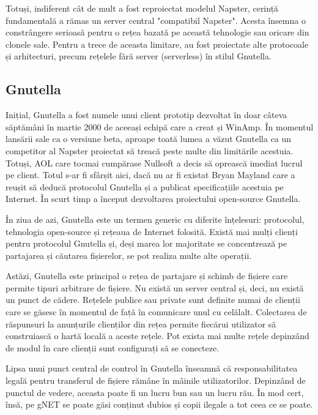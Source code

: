 Totuși, indiferent cât de mult a fost reproiectat modelul Napster, cerință
fundamentală a rămas un server central "compatibil Napster". Acesta însemna o
constrângere serioasă pentru o rețea bazată pe această tehnologie sau oricare
din clonele sale. Pentru a trece de aceasta limitare, au fost proiectate alte
protocoale și arhitecturi, precum rețelele fără server (serverless) în stilul
Gnutella.

\subsection{Gnutella}

Inițial, Gnutella a fost numele unui client prototip dezvoltat în doar câteva
săptămâni în martie 2000 de aceeași echipă care a creat și WinAmp. În momentul
lansării sale ca o versiune beta, aproape toată lumea a văzut Gnutella ca un
competitor al Napster proiectat să  treacă peste multe din limitările
acestuia. Totuși, AOL care tocmai cumpărase Nullsoft a decis să oprească
imediat lucrul pe client. Totul s-ar fi sfârșit aici, dacă nu ar fi existat
Bryan Mayland care a reușit să deducă protocolul Gnutella și a publicat
specificațiile acestuia pe Internet. În scurt timp a început dezvoltarea
proiectului open-source Gnutella.

În ziua de azi, Gnutella este un termen generic cu diferite înțelesuri:
protocolul, tehnologia open-source și rețeaua de Internet folosită. Există mai
mulți clienți pentru protocolul Gnutella și, deși marea lor majoritate se
concentrează pe partajarea și căutarea fișierelor, se pot realiza multe alte
operații.

Astăzi, Gnutella este principal o rețea de partajare și schimb de fișiere care
permite tipuri arbitrare de fișiere. Nu există un server central și, deci, nu
există un punct de cădere. Rețelele publice sau private sunt definite numai de
clienții care se găsesc în momentul de față în comunicare unul cu celălalt.
Colectarea de răspunsuri la anunțurile clienților din rețea permite fiecărui
utilizator să construiască o hartă locală a aceste rețele. Pot exista mai
multe rețele depinzând de modul în care clienții sunt configurați să se
conecteze.

Lipsa unui punct central de control în Gnutella înseamnă că responsabilitatea
legală pentru transferul de fișiere rămâne în mâinile utilizatorilor.
Depinzând de punctul de vedere, aceasta poate fi un lucru bun sau un lucru
rău. În mod cert, însă, pe gNET se poate găsi conținut dubios și copii ilegale
a tot ceea ce se poate.

